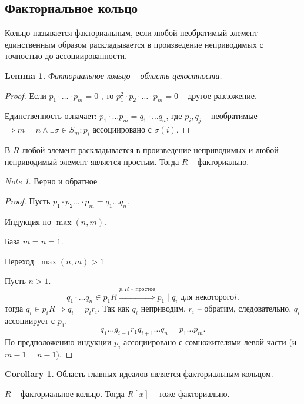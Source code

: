 \documentclass[11pt]{book}
\theoremstyle{definition}
\theoremstyle{plain}
\theoremstyle{plain}
\newtheorem*{lm}{Lemma}
\theoremstyle{definition}
\newtheorem*{cor}{Corollary}
\theoremstyle{remark}
\newtheorem*{note}{Note}
\begin{document}
\subsection{Факториальное кольцо}
\begin{defn}
    Кольцо называется факториальным, если любой необратимый элемент единственным образом раскладывается в произведение неприводимых с точностью до ассоциированности.
\end{defn}
\begin{lm}
    Факториальное кольцо -- область целостности.
\end{lm}
\begin{proof}
    Если $ p_1\cdot \ldots \cdot p_m = 0$ , то $ p_1^2 \cdot p_2 \cdot \ldots  \cdot p_m = 0$ -- другое разложение.

    Единственность означает:
    $ p_1 \cdot \ldots  p_m = q_1 \cdot \ldots q_n $, где $ p_i, q_j$ -- необратимые $ \Longrightarrow m=n \wedge \exists  \sigma \in  S_m: p_i  $ ассоциировано с $ \sigma (i)$.
\end{proof}
\begin{thm}
    В $ R$ любой элемент раскладывается в произведение неприводимых и любой неприводимый элемент является простым. Тогда $ R$ -- факториально.
\end{thm}
\begin{note}
    Верно и обратное
\end{note}
\begin{proof}
    Пусть $ p_1 \cdot p_2 \ldots  \cdot p_m = q_1 \ldots  q_n$.

    Индукция по $ \max(n, m)$.

    База $m=n = 1$.

    Переход:  $ \max(n, m) > 1$

    Пусть $ n > 1$. \[
	q_1 \cdot \ldots q_n \in  p_1 R \stackrel{p_1 R \text{ -- простое}}\Longrightarrow  p_1\mid q_i \text{  для некоторого} i  
    .\] 
    тогда $q_i \in  p_i R \Longrightarrow  q_i = p_i r_i$. Так как $ q_i$  неприводим, $ r_i$ -- обратим, следовательно, $ q_i$ ассоциирует с $ p_1$.
\[
q_1 \ldots g_{i-1} r_1 q_{i+1} \ldots  q_n = p_1 \ldots  p_m
.\] 
По предположению индукции $ p_i$ ассоциировано с сомножителями левой части (и $ m-1 = n-1$).
\end{proof}
\begin{cor}
    Область главных идеалов является факториальным кольцом.
\end{cor}
\begin{thm}
    $ R$ -- факториальное кольцо. Тогда $ R[x]$ -- тоже факториально.
\end{thm}
\end{document}
